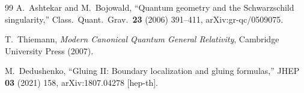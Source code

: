 \documentclass[12pt]{article}
\theoremstyle{definition}
\begin{document}
\begin{thebibliography}{99}
A.~Ashtekar and M.~Bojowald,
``Quantum geometry and the Schwarzschild singularity,''
Class.\ Quant.\ Grav.\ \textbf{23} (2006) 391--411,
arXiv:gr-qc/0509075.

T.~Thiemann,
\textit{Modern Canonical Quantum General Relativity},
Cambridge University Press (2007).

M.~Dedushenko,
``Gluing II: Boundary localization and gluing formulas,''
JHEP \textbf{03} (2021) 158,
arXiv:1807.04278 [hep-th].

\end{thebibliography}
\end{document}
